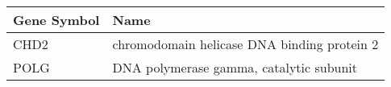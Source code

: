 \begin{tabular}{ll}
\toprule
Gene Symbol &                                        Name \\
\midrule
       CHD2 & chromodomain helicase DNA binding protein 2 \\
       POLG &     DNA polymerase gamma, catalytic subunit \\
\bottomrule
\end{tabular}

